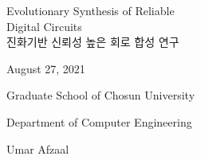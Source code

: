 
\vspace*{20mm}

\begin{center}
\huge \sffamily
		Evolutionary Synthesis of Reliable \\
		Digital Circuits \\
		\large{진화기반 신뢰성 높은 회로 합성 연구}
\end{center}

\vspace{50mm}
\begin{center}
	{\large \sffamily August 27, 2021}
\end{center}
\vspace{10mm}
\begin{center}
	{\LARGE \sffamily Graduate School of Chosun University}
\end{center}
\vspace{1mm}
\begin{center}
	{\Large \sffamily Department of Computer Engineering}
\end{center}
\vspace{1mm}
\begin{center}
	{\LARGE \sffamily Umar Afzaal}
\end{center}
\cleardoublepage